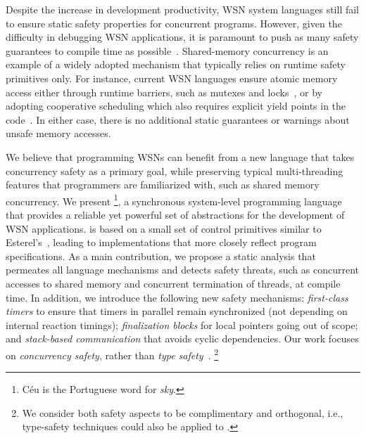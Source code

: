 Despite the increase in development productivity, WSN system languages still 
fail to ensure static safety properties for concurrent programs.
%
However, given the difficulty in debugging WSN applications, it is paramount to 
push as many safety guarantees to compile time as possible~\cite{wsn.decade}.
%
Shared-memory concurrency is an example of a widely adopted mechanism that 
typically relies on runtime safety primitives only.
For instance, current WSN languages ensure atomic memory access either through 
runtime barriers, such as mutexes and 
locks~\cite{wsn.mantisos,wsn.tinythreads}, or by adopting cooperative 
scheduling which also requires explicit yield points in the 
code~\cite{wsn.sol,wsn.protothreads}.
In either case, there is no additional static guarantees or warnings about 
unsafe memory accesses.

We believe that programming WSNs can benefit from a new language that takes 
concurrency safety as a primary goal, while preserving typical multi-threading 
features that programmers are familiarized with, such as shared memory 
concurrency.
%
We present \CEU%
\footnote{C\'eu is the Portuguese word for \emph{sky}.},
a synchronous system-level programming language that provides a reliable yet 
powerful set of abstractions for the development of WSN applications.
%
\CEU is based on a small set of control primitives similar to 
Esterel's~\cite{esterel.ieee91}, leading to implementations that more closely 
reflect program specifications.
%
As a main contribution, we propose a static analysis that permeates all 
language mechanisms and detects safety threats, such as concurrent accesses to 
shared memory and concurrent termination of threads, at compile time.
%
In addition, we introduce the following new safety mechanisms:
\emph{first-class timers} to ensure that timers in parallel remain synchronized 
(not depending on internal reaction timings);
\emph{finalization blocks} for local pointers going out of scope;
and \emph{stack-based communication} that avoids cyclic dependencies.
%
Our work focuses on \emph{concurrency safety}, rather than \emph{type 
safety}~\cite{wsn.safety}.%
\footnote{
We consider both safety aspects to be complimentary and orthogonal, i.e., 
type-safety techniques could also be applied to \CEU.
}

